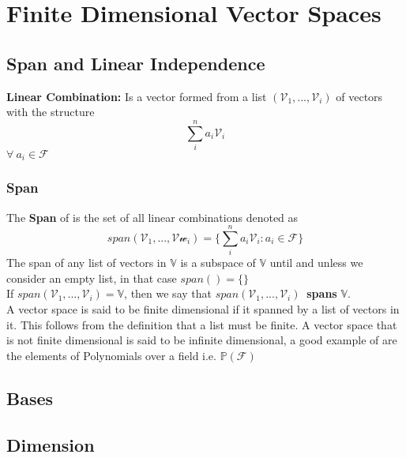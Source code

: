 \chapter{Finite Dimensional Vector Spaces}
\section{Span and Linear Independence}
\textbf{Linear Combination:} Is a vector formed from a list $(\mathcal{V}_{1}, ... ,\mathcal{V}_{i})$ of vectors with the structure
\begin{equation}
	\sum_{i}^{n} a_{i}\mathcal{V}_{i}
\end{equation}
$\forall \ a_{i} \in \mathcal{F}$\\
\subsection{Span}
The \textbf{Span} of is the set of all linear combinations denoted as
\begin{equation}
	span(\mathcal{V}_{1}, ... ,\mathcal{Vw}_{i}) = \{\sum_{i}^{n} a_{i}\mathcal{V}_{i} : a_{i} \in \mathcal{F} \}
\end{equation}
The span of any list of vectors in $\mathbb{V}$ is a subspace of $\mathbb{V}$ until and unless we consider an empty list, in that case $span() = \{\}$\\[0.1in]
If $span(\mathcal{V}_{1}, ... ,\mathcal{V}_{i}) = \mathbb{V}$, then we say that $span(\mathcal{V}_{1}, ... ,\mathcal{V}_{i}) \ $ \textbf{spans} $\mathbb{V}$.\\[2in]
A vector space is said to be finite dimensional if it spanned by a list of vectors in it. This follows from the definition that a list must be finite.
A vector space that is not finite dimensional is said to be infinite dimensional, a good example of are the elements of Polynomials over a field i.e. $\mathbb{P}(\mathcal{F})$
\section{Bases}

\section{Dimension}